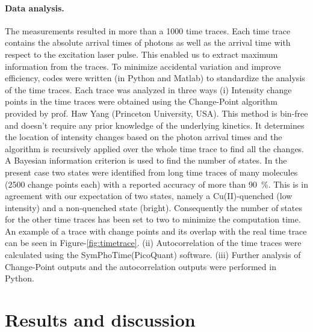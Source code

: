 \paragraph*{Data analysis.}
The measurements resulted in more than a 1000 time traces.
Each time trace contains the absolute arrival times of photons as well as the arrival time with respect to the excitation laser pulse.
This enabled us to extract maximum information from the traces.
To minimize accidental variation and improve efficiency, codes were written (in Python and Matlab) to standardize the analysis of the time traces.
Each trace was analyzed in three ways (i) Intensity change points in the time traces were obtained using the Change-Point algorithm\cite{watkins2005detection} provided by prof. Haw Yang 
(Princeton University, USA).
This method is bin-free and doesn't require any prior knowledge of the underlying kinetics.
It determines the location of intensity changes based on the photon arrival times and the algorithm is recursively applied over the whole time trace to find all the changes.
A Bayesian information criterion is used to find the number of states.
In the present case two states were identified from long time traces of many molecules (2500 change points each) with a reported accuracy of more than \SI{90}{\percent}.
This is in agreement with our expectation of two states, namely a Cu(II)-quenched (low intensity) and a non-quenched state (bright).
Consequently the number of states for the other time traces has been set to two to minimize the computation time.
An example of a trace with change points and its overlap with the real time trace can be seen in Figure-\ref{fig:timetrace}.
(ii) Autocorrelation of the time traces were calculated using the SymPhoTime(PicoQuant) software.
(iii) Further analysis of Change-Point outputs and the autocorrelation outputs were performed in Python.

\section{Results and discussion\label{sec:results}}
